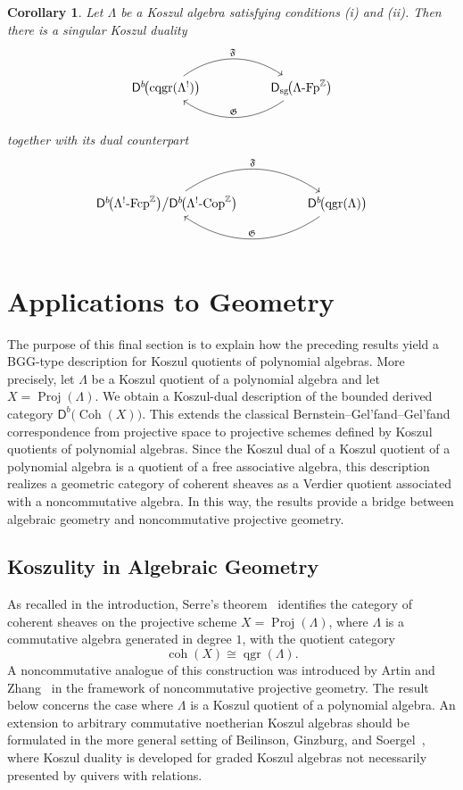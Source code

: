 \documentclass[11pt]{article}
\newtheorem{corollary}[theorem]{Corollary}
\theoremstyle{definition}
\theoremstyle{remark}
\begin{document}
\begin{corollary}
Let \(\Lambda\) be a Koszul algebra satisfying conditions \textup{(i)} and \textup{(ii)}. Then there is a singular Koszul duality
\[
\begin{tikzcd}[column sep=huge]
\mathsf{D}^{b}\!\bigl(
\operatorname{cqgr}(\Lambda^{!})
\bigr)
\arrow[r, bend left=35, "\mathfrak{F}"]
&
\mathsf{D}_{\mathrm{sg}}\!\bigl(
\Lambda\textup{-}\mathrm{Fp}^{\mathbb{Z}}
\bigr)
\arrow[l, bend left=35, "\mathfrak{G}"']
\end{tikzcd}
\]
together with its dual counterpart
\[
\begin{tikzcd}[column sep=huge]
\mathsf{D}^{b}\!\bigl(
\Lambda^{!}\textup{-}\mathrm{Fcp}^{\mathbb{Z}}
\bigr)
\big/
\mathsf{D}^{b}\!\bigl(\Lambda^{!}\textup{-Cop}^{\mathbb{Z}}\bigr)
\arrow[r, bend left=35, "\mathfrak{F}"]
&
\mathsf{D}^{b}\!\bigl(
\operatorname{qgr}(\Lambda)
\bigr)
\arrow[l, bend left=35, "\mathfrak{G}"']
\end{tikzcd}
\]
\end{corollary}
\section{Applications to Geometry}
The purpose of this final section is to explain how the preceding results yield a BGG-type description for Koszul quotients of polynomial algebras. More precisely, let \(\Lambda\) be a Koszul quotient of a polynomial algebra and let \(X=\operatorname{Proj}(\Lambda)\). We obtain a Koszul-dual description of the bounded derived category \(  \mathsf{D}^{b}\!\bigl(\operatorname{Coh}(X)\bigr). \)
This extends the classical Bernstein--Gel'fand--Gel'fand correspondence from projective space to projective schemes defined by Koszul quotients of polynomial algebras. Since the Koszul dual of a Koszul quotient of a polynomial algebra is a quotient of a free associative algebra, this description realizes a geometric category of coherent sheaves as a Verdier quotient associated with a noncommutative algebra. In this way, the results provide a bridge between algebraic geometry and noncommutative projective geometry.
\subsection{Koszulity in Algebraic Geometry} As recalled in the introduction, Serre's theorem~\cite{37} identifies the category of coherent sheaves on the projective scheme \(X=\operatorname{Proj}(\Lambda)\), where \(\Lambda\) is a commutative algebra generated in degree \(1\), with the quotient category \[ \operatorname{coh}(X) \cong \operatorname{qgr}(\Lambda). \] A noncommutative analogue of this construction was introduced by Artin and Zhang~\cite{1} in the framework of noncommutative projective geometry. The result below concerns the case where \(\Lambda\) is a Koszul quotient of a polynomial algebra. An extension to arbitrary commutative noetherian Koszul algebras should be formulated in the more general setting of Beilinson, Ginzburg, and Soergel~\cite{5}, where Koszul duality is developed for graded Koszul algebras not necessarily presented by quivers with relations.
\end{document}
